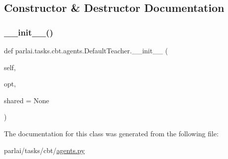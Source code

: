\subsection{Constructor \& Destructor Documentation}
\mbox{\label{classparlai_1_1tasks_1_1cbt_1_1agents_1_1DefaultTeacher_a2a25b29b63e7edb52d411115ee5e2030}} 
\subsubsection{\texorpdfstring{\+\_\+\+\_\+init\+\_\+\+\_\+()}{\_\_init\_\_()}}
{\footnotesize\ttfamily def parlai.\+tasks.\+cbt.\+agents.\+Default\+Teacher.\+\_\+\+\_\+init\+\_\+\+\_\+ (\begin{DoxyParamCaption}\item[{}]{self,  }\item[{}]{opt,  }\item[{}]{shared = {\ttfamily None} }\end{DoxyParamCaption})}



The documentation for this class was generated from the following file\+:\begin{DoxyCompactItemize}
\item 
parlai/tasks/cbt/\hyperlink{parlai_2tasks_2cbt_2agents_8py}{agents.\+py}\end{DoxyCompactItemize}
